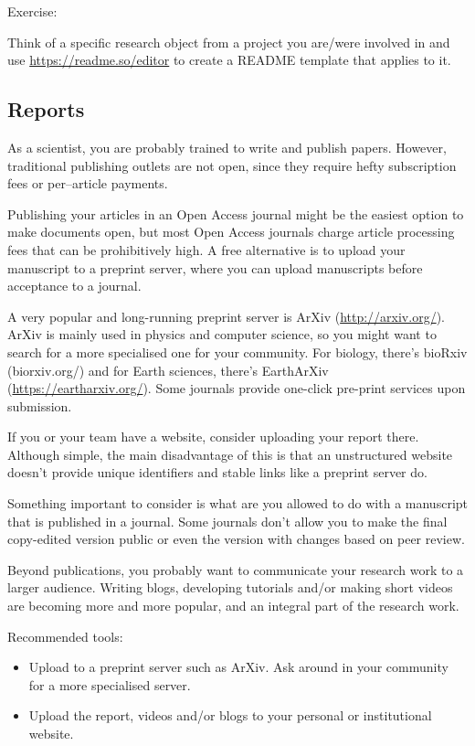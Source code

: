 \documentclass[
  letterpaper,
  DIV=11,
  numbers=noendperiod]{scrreport}
\providecommand{\tightlist}{%
  \setlength{\itemsep}{0pt}\setlength{\parskip}{0pt}}\usepackage{longtable,booktabs,array}
\begin{document}
Exercise:

Think of a specific research object from a project you are/were involved
in and use \url{https://readme.so/editor} to create a README template
that applies to it.

\hypertarget{reports}{%
\subsection{Reports}\label{reports}}

As a scientist, you are probably trained to write and publish papers.
However, traditional publishing outlets are not open, since they require
hefty subscription fees or per--article payments.

Publishing your articles in an Open Access journal might be the easiest
option to make documents open, but most Open Access journals charge
article processing fees that can be prohibitively high. A free
alternative is to upload your manuscript to a preprint server, where you
can upload manuscripts before acceptance to a journal.

A very popular and long-running preprint server is ArXiv
(\url{http://arxiv.org/}). ArXiv is mainly used in physics and computer
science, so you might want to search for a more specialised one for your
community. For biology, there's bioRxiv (biorxiv.org/) and for Earth
sciences, there's EarthArXiv (\url{https://eartharxiv.org/}). Some
journals provide one-click pre-print services upon submission.

If you or your team have a website, consider uploading your report
there. Although simple, the main disadvantage of this is that an
unstructured website doesn't provide unique identifiers and stable links
like a preprint server do.

Something important to consider is what are you allowed to do with a
manuscript that is published in a journal. Some journals don't allow you
to make the final copy-edited version public or even the version with
changes based on peer review.

Beyond publications, you probably want to communicate your research work
to a larger audience. Writing blogs, developing tutorials and/or making
short videos are becoming more and more popular, and an integral part of
the research work.

Recommended tools:

\begin{itemize}
\tightlist
\item
  Upload to a preprint server such as ArXiv. Ask around in your
  community for a more specialised server.
\item
  Upload the report, videos and/or blogs to your personal or
  institutional website.
\end{itemize}
\end{document}
